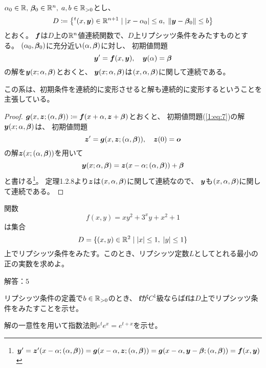 \documentclass[report]{jlreq}
\begin{document}
\begin{corollary}[1.2.9 初期値に関する解の連続性]
    $\alpha_0 \in \R,\, \bbeta_0 \in \R^n,\; a, b \in \R_{>0}$とし、
    \begin{equation}
        D \coloneqq \left\{
            {}^t(x, \by) \in \R^{n+1}
            \mid
            |x - \alpha_0| \le a,\;
            \| \by - \bbeta_0 \| \le b
        \right\}
    \end{equation}
    とおく。
    $\bf$は$D$上の$\R^n$値連続関数で、$D$上リプシッツ条件をみたすものとする。
    $(\alpha_0, \bbeta_0)$に充分近い$(\alpha, \bbeta)$に対し、
    初期値問題
    \begin{equation}
        \by' = \bf(x, \by),\quad \by(\alpha) = \bbeta
        \label{1:eq:7}
    \end{equation}
    の解を$\by(x; \alpha, \bbeta)$とおくと、
    $\by(x; \alpha, \bbeta)$は$(x, \alpha, \bbeta)$に関して連続である。
\end{corollary}

この系は、初期条件を連続的に変形させると解も連続的に変形するということを主張している。

\begin{proof}
    $\bg(x, \bz; (\alpha, \bbeta)) \coloneqq \bf(x + \alpha, \bz + \bbeta)$とおくと、
    初期値問題(\ref{1:eq:7})の解$\by(x; \alpha, \bbeta)$は、
    初期値問題
    \begin{equation}
        \bz' = \bg(x, \bz; (\alpha, \bbeta)),\quad \bz(0) = \bm{o}
    \end{equation}
    の解$\bz(x; (\alpha, \bbeta))$を用いて
    \begin{equation}
        \by(x; \alpha, \bbeta) = \bz(x - \alpha; (\alpha, \bbeta)) + \bbeta
    \end{equation}
    と書ける\footnote{
        $\by' = \bz'(x-\alpha; (\alpha, \bbeta)) = \bg(x-\alpha, \bz; (\alpha, \bbeta))
            = \bg(x-\alpha, \by - \bbeta; (\alpha, \bbeta))
            = \bf(x, \by)$
    }。
    定理1.2.8より$\bz$は$(x, \alpha, \bbeta)$に関して連続なので、
    $\by$も$(x, \alpha, \bbeta)$に関して連続である。
\end{proof}


\begin{problem}[小テスト2]
    関数
    \begin{equation}
        f(x, y) = xy^2 + 3^x y + x^2 + 1
    \end{equation}
    は集合
    \begin{equation}
        D = \{ (x, y) \in \R^2 \mid |x| \le 1,\; |y| \le 1 \}
    \end{equation}
    上でリプシッツ条件をみたす。このとき、リプシッツ定数$L$としてとれる最小の正の実数を求めよ。

    解答：$5$
\end{problem}

\begin{problem}[例1.2.4]
    リプシッツ条件の定義で$b \in \R_{>0}$のとき、
    $\bm{f}$が$C^1$級ならば$\bm{f}$は$D$上でリプシッツ条件をみたすことを示せ。
\end{problem}

\begin{problem}[例1.2.10]
    解の一意性を用いて指数法則$e^t e^x = e^{t+x}$を示せ。
\end{problem}
\end{document}
